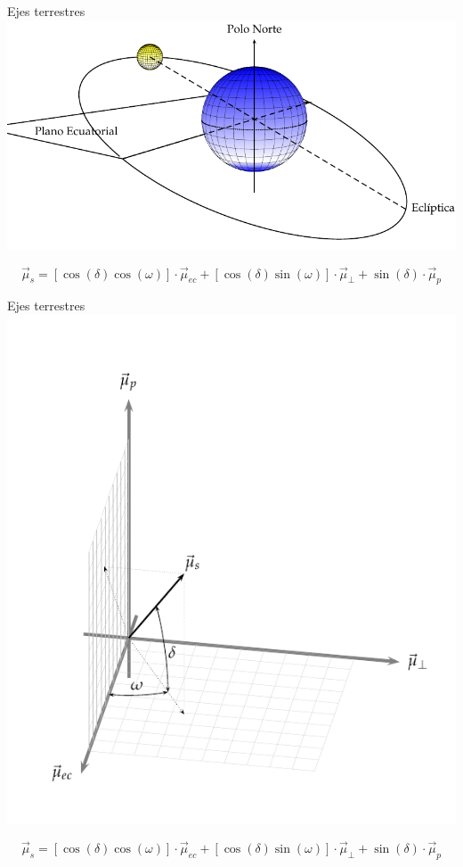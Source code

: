 \documentclass[xcolor={usenames,svgnames,dvipsnames}]{beamer}
\begin{document}
\begin{frame}[label=sec-1-2-1]{Ejes terrestres}
\includegraphics[width=.9\linewidth]{../figs/SoldesdeTierra.pdf}

\[\vec{\mu}_{s}=\left[\cos\left(\delta\right)\cos\left(\omega\right)\right]\cdot\vec{\mu}_{ec}+\left[\cos\left(\delta\right)\sin\left(\omega\right)\right]\cdot\vec{\mu}_{\bot}+\sin\left(\delta\right)\cdot\vec{\mu}_{p}\]
\end{frame}



\begin{frame}[label=sec-1-2-2]{Ejes terrestres}
\includegraphics[height=0.7\textheight]{../figs/SistemaCoordenadasTerrestre.pdf}


\[\vec{\mu}_{s}=\left[\cos\left(\delta\right)\cos\left(\omega\right)\right]\cdot\vec{\mu}_{ec}+\left[\cos\left(\delta\right)\sin\left(\omega\right)\right]\cdot\vec{\mu}_{\bot}+\sin\left(\delta\right)\cdot\vec{\mu}_{p}\]
\end{frame}
\end{document}
